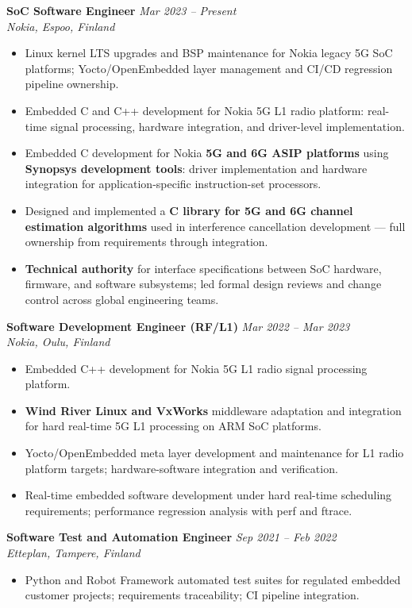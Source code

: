 \documentclass[10.5pt,a4paper]{article}
\newcommand{\job}[3]{%
  \noindent\textbf{#1} \hfill \textit{#2}\\
  \textit{\color{accent}#3}%
}
\begin{document}
\job{SoC Software Engineer}{Mar 2023 -- Present}{Nokia, Espoo, Finland}
\begin{itemize}
  \item Linux kernel LTS upgrades and BSP maintenance for Nokia legacy 5G SoC platforms;
    Yocto/OpenEmbedded layer management and CI/CD regression pipeline ownership.
  \item Embedded C and C++ development for Nokia 5G L1 radio platform: real-time signal
    processing, hardware integration, and driver-level implementation.
  \item Embedded C development for Nokia \textbf{5G and 6G ASIP platforms} using
    \textbf{Synopsys development tools}: driver implementation and hardware integration
    for application-specific instruction-set processors.
  \item Designed and implemented a \textbf{C library for 5G and 6G channel estimation
    algorithms} used in interference cancellation development --- full ownership from
    requirements through integration.
  \item \textbf{Technical authority} for interface specifications between SoC hardware,
    firmware, and software subsystems; led formal design reviews and change control
    across global engineering teams.
\end{itemize}

\vspace{4pt}

\job{Software Development Engineer (RF/L1)}{Mar 2022 -- Mar 2023}{Nokia, Oulu, Finland}
\begin{itemize}
  \item Embedded C++ development for Nokia 5G L1 radio signal processing platform.
  \item \textbf{Wind River Linux and VxWorks} middleware adaptation and integration
    for hard real-time 5G L1 processing on ARM SoC platforms.
  \item Yocto/OpenEmbedded meta layer development and maintenance for L1 radio
    platform targets; hardware-software integration and verification.
  \item Real-time embedded software development under hard real-time scheduling
    requirements; performance regression analysis with perf and ftrace.
\end{itemize}

\vspace{4pt}

\job{Software Test and Automation Engineer}{Sep 2021 -- Feb 2022}{Etteplan, Tampere, Finland}
\begin{itemize}
  \item Python and Robot Framework automated test suites for regulated embedded customer projects; requirements traceability; CI pipeline integration.
\end{itemize}
\end{document}
